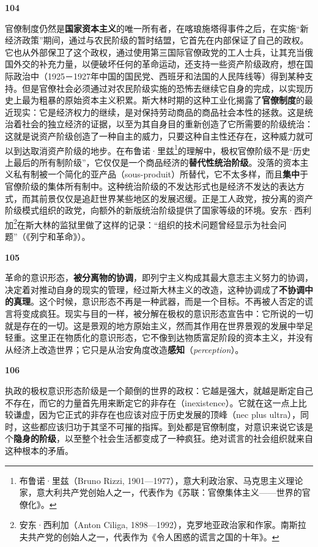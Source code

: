 \documentclass[fontset=fandol, a4paper, 12pt, openright]{ctexbook}
\makeatletter
\newcommand{\thesis}[1]{%
    \par\vspace{1.5em}%
    {\centering \textbf{\Large #1}\par}%
    \nobreak\vspace{0.5em}\nobreak
    \@afterindenttrue %
    \@afterheading    %
}
\makeatother
\begin{document}
\thesis{104}
官僚制度仍然是\textbf{国家资本主义}的唯一所有者，在喀琅施塔得事件之后，在实施“新经济政策”期间，通过与农民阶级的暂时结盟，它首先在内部保证了自己的政权。它也从外部保卫了这个政权，通过使用第三国际官僚政党的工人士兵，让其充当俄国外交的补充力量，以便破坏任何的革命运动，还支持一些资产阶级政府，想在国际政治中（1925－1927年中国的国民党、西班牙和法国的人民阵线等）得到某种支持。但是官僚社会必须通过对农民阶级实施的恐怖去继续它自身的完成，以实现历史上最为粗暴的原始资本主义积累。斯大林时期的这种工业化揭露了\textbf{官僚制度}的最近现实：它是经济权力的继续，是对保持劳动商品的商品社会本性的拯救。这是统治着社会的独立经济的证据，以至为其自身目的重新创造了它所需要的阶级统治：这就是说资产阶级创造了一种自主的威力，只要这种自主性还存在，这种威力就可以到达取消资产阶级的地步。在布鲁诺·里兹\footnote{布鲁诺·里兹（Bruno Rizzi, 1901—1977），意大利政治家、马克思主义理论家，意大利共产党创始人之一，代表作为《苏联：官僚集体主义——世界的官僚化》。}的理解中，极权官僚阶级不是“历史上最后的所有制阶级”，它仅仅是一个商品经济的\textbf{替代性统治阶级}。没落的资本主义私有制被一个简化的亚产品（sous-produit）所替代，它不太多样，而且\textbf{集中}于官僚阶级的集体所有制中。这种统治阶级的不发达形式也是经济不发达的表达方式，而其前景仅仅是追赶世界某些地区的发展迟缓。正是工人政党，按分离的资产阶级模式组织的政党，向额外的新版统治阶级提供了国家等级的环境。安东·西利加\footnote{安东·西利加（Anton Ciliga, 1898—1992），克罗地亚政治家和作家。南斯拉夫共产党的创始人之一，代表作为《令人困惑的谎言之国的十年》。}在斯大林的监狱里做了这样的记录：“组织的技术问题曾经显示为社会问题”（《列宁和革命》）。

\thesis{105}
革命的意识形态，\textbf{被分离物的协调}，即列宁主义构成其最大意志主义努力的协调，决定着对推动自身的现实的管理，经过斯大林主义的改造，这种协调成了\textbf{不协调中的真理}。这个时候，意识形态不再是一种武器，而是一个目标。不再被人否定的谎言将变成疯狂。现实与目的一样，被分解在极权的意识形态宣告中：它所说的一切就是存在的一切。这是景观的地方原始主义，然而其作用在世界景观的发展中举足轻重。这里正在物质化的意识形态，它不像到达物质富足阶段的资本主义，并没有从经济上改造世界；它只是从治安角度改造\textbf{感知}（\textit{perception}）。

\thesis{106}
执政的极权意识形态阶级是一个颠倒的世界的政权：它越是强大，就越是断定自己不存在，而它的力量首先用来断定它的非存在（inexistence）。它就在这一点上比较谦虚，因为它正式的非存在也应该对应于历史发展的顶峰（nec plus ultra），同时，这些都应该归功于其坚不可摧的指挥。到处都是官僚制度，对意识来说它该是个\textbf{隐身的阶级}，以至整个社会生活都变成了一种疯狂。绝对谎言的社会组织就来自这种根本的矛盾。
\end{document}
